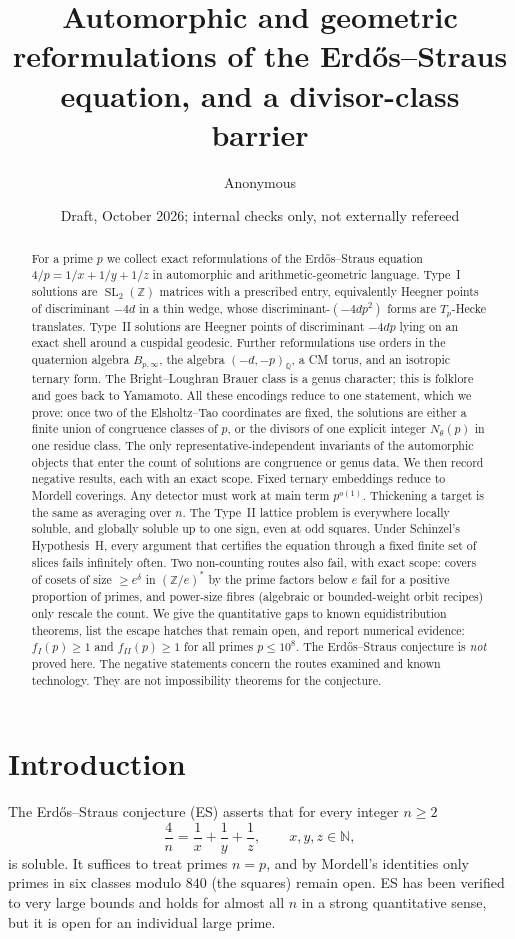\documentclass[10pt,reqno]{amsart}
\title[Automorphic and geometric reformulations of Erd\H{o}s--Straus]{Automorphic and geometric reformulations of the Erd\H{o}s--Straus equation, and a divisor-class barrier}
\author{Anonymous}
\date{Draft, October 2026; internal checks only, not externally refereed}
\theoremstyle{definition}
\numberwithin{equation}{section}
\newcommand{\Z}{\mathbb Z}
\newcommand{\N}{\mathbb N}
\newcommand{\Q}{\mathbb Q}
\DeclareMathOperator{\SL}{SL}
\begin{document}
\begin{abstract}
For a prime $p$ we collect exact reformulations of the Erd\H{o}s--Straus
equation $4/p=1/x+1/y+1/z$ in automorphic and arithmetic-geometric
language. Type~I solutions are $\SL_2(\Z)$ matrices with a prescribed
entry, equivalently Heegner points of discriminant $-4d$ in a thin wedge,
whose discriminant-$(-4dp^2)$ forms are $T_p$-Hecke translates. Type~II
solutions are Heegner points of discriminant $-4dp$ lying on an exact
shell around a cuspidal geodesic. Further reformulations use orders in the
quaternion algebra $B_{p,\infty}$, the algebra $(-d,-p)_\Q$, a CM torus,
and an isotropic ternary form. The Bright--Loughran Brauer class is a
genus character; this is folklore and goes back to Yamamoto. All these
encodings reduce to one statement, which we prove: once two of the
Elsholtz--Tao coordinates are fixed, the solutions are either a finite
union of congruence classes of $p$, or the divisors of one explicit integer
$N_\theta(p)$ in one residue class. The only representative-independent
invariants of the automorphic objects that enter the count of solutions
are congruence or genus data. We then
record negative results, each with an exact scope. Fixed ternary embeddings
reduce to Mordell coverings. Any detector must work at main term
$p^{o(1)}$. Thickening a target is the same as averaging over $n$. The
Type~II lattice problem is everywhere locally soluble, and globally soluble
up to one sign, even at odd squares. Under Schinzel's
Hypothesis~H, every argument that certifies the equation through a fixed
finite set of slices fails infinitely often. Two non-counting routes
also fail, with exact scope: covers of cosets of size $\ge e^\delta$ in
$(\Z/e)^*$ by the prime factors below $e$ fail for a positive proportion of primes, and
power-size fibres (algebraic or bounded-weight orbit recipes) only rescale
the count. We give the quantitative gaps
to known equidistribution theorems, list the escape hatches that remain
open, and report numerical evidence: $f_I(p)\ge1$ and $f_{II}(p)\ge1$ for
all primes $p\le10^8$. The Erd\H{o}s--Straus conjecture is \emph{not}
proved here. The negative statements concern the routes examined and known
technology. They are not impossibility theorems for the conjecture.
\end{abstract}
\maketitle
\setcounter{tocdepth}{1}
\tableofcontents

\section{Introduction}\label{sec:intro}
The Erd\H{o}s--Straus conjecture (ES) asserts that for every integer
$n\ge2$
\begin{equation}\label{eq:es}
 \frac4n=\frac1x+\frac1y+\frac1z,\qquad x,y,z\in\N,
\end{equation}
is soluble. It suffices to treat primes $n=p$, and by Mordell's
identities only primes in six classes modulo $840$ (the squares) remain
open. ES has been verified to very large bounds and holds for almost all
$n$ in a strong quantitative sense, but it is open for an individual large
prime.
\end{document}
